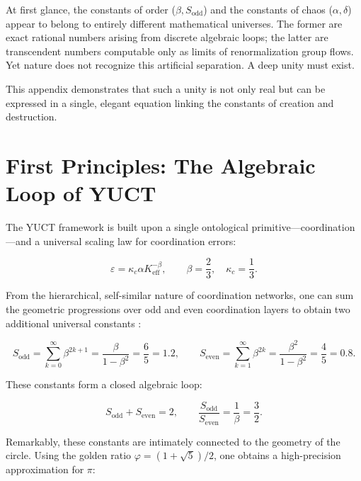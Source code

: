 \documentclass[12pt,a4paper]{article}
\begin{document}
{	At first glance, the constants of order (\(\beta, S_{\mathrm{odd}}\)) and the constants of chaos (\(\alpha, \delta\)) appear to belong to entirely different mathematical universes. The former are exact rational numbers arising from discrete algebraic loops; the latter are transcendent numbers computable only as limits of renormalization group flows. Yet nature does not recognize this artificial separation. A deep unity must exist.
	
	This appendix demonstrates that such a unity is not only real but can be expressed in a single, elegant equation linking the constants of creation and destruction.
	
	\section{First Principles: The Algebraic Loop of YUCT}
	
	The YUCT framework is built upon a single ontological primitive---coordination---and a universal scaling law for coordination errors:
	
	\begin{equation}
		\varepsilon = \kappa_c \alpha K_{\mathrm{eff}}^{-\beta}, \qquad \beta = \frac{2}{3}, \quad \kappa_c = \frac{1}{3}.
	\end{equation}
	
	From the hierarchical, self-similar nature of coordination networks, one can sum the geometric progressions over odd and even coordination layers to obtain two additional universal constants \cite{AppendixFerra}:
	
	\begin{equation}
		S_{\mathrm{odd}} = \sum_{k=0}^{\infty} \beta^{2k+1} = \frac{\beta}{1-\beta^2} = \frac{6}{5} = 1.2, \qquad
		S_{\mathrm{even}} = \sum_{k=1}^{\infty} \beta^{2k} = \frac{\beta^2}{1-\beta^2} = \frac{4}{5} = 0.8.
	\end{equation}
	
	These constants form a closed algebraic loop:
	
	\begin{equation}
		S_{\mathrm{odd}} + S_{\mathrm{even}} = 2, \qquad \frac{S_{\mathrm{odd}}}{S_{\mathrm{even}}} = \frac{1}{\beta} = \frac{3}{2}.
	\end{equation}
	
	Remarkably, these constants are intimately connected to the geometry of the circle. Using the golden ratio \(\varphi = (1+\sqrt{5})/2\), one obtains a high-precision approximation for \(\pi\):
	
}
\end{document}
